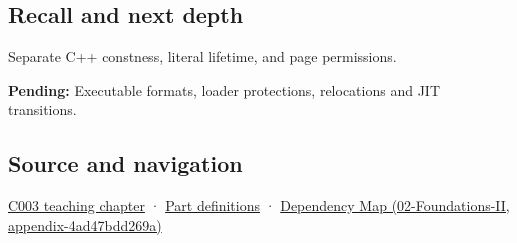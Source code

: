 \subsection{Recall and next depth}\label{appendix-5f9e5e2f0a5e-recall-and-next-depth}

Separate C++ constness, literal lifetime, and page permissions.

\textbf{Pending:} Executable formats, loader protections, relocations and JIT transitions.

\subsection{Source and navigation}\label{appendix-5f9e5e2f0a5e-source-and-navigation}

\hyperref[01-foundations-i-ch002-where-the-bytes-live]{C003 teaching chapter} · \hyperref[appendix-fd090d982a15-m003---parts-41-60]{Part definitions} · \href{../02-Foundations-II/main.pdf\#nameddest=appendix-4ad47bdd269a}{Dependency Map (02-Foundations-II, appendix-4ad47bdd269a)}
